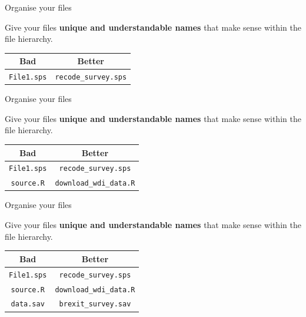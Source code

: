 \documentclass[10pt]{beamer}
\begin{document}
\begin{frame}{Organise your files}

    Give your files \textbf{unique and understandable names} that make sense within the file hierarchy.

    \begin{table}
        \begin{tabular}{c c}
        \hline
        Bad & Better \\
        \hline\hline
        \texttt{File1.sps} & \texttt{recode\_survey.sps} \\
        \hline
        \end{tabular}
    \end{table}

\end{frame}

\begin{frame}{Organise your files}

    Give your files \textbf{unique and understandable names} that make sense within the file hierarchy.

    \begin{table}
        \begin{tabular}{c c}
        \hline
        Bad & Better \\
        \hline\hline
        \texttt{File1.sps} & \texttt{recode\_survey.sps} \\
        \texttt{source.R} & \texttt{download\_wdi\_data.R} \\
        \hline
        \end{tabular}
    \end{table}

\end{frame}

\begin{frame}{Organise your files}

    Give your files \textbf{unique and understandable names} that make sense within the file hierarchy.

    \begin{table}
        \begin{tabular}{c c}
        \hline
        Bad & Better \\
        \hline\hline
        \texttt{File1.sps} & \texttt{recode\_survey.sps} \\
        \texttt{source.R} & \texttt{download\_wdi\_data.R} \\
        \texttt{data.sav} & \texttt{brexit\_survey.sav} \\
        \hline
        \end{tabular}
    \end{table}

\end{frame}
\end{document}
